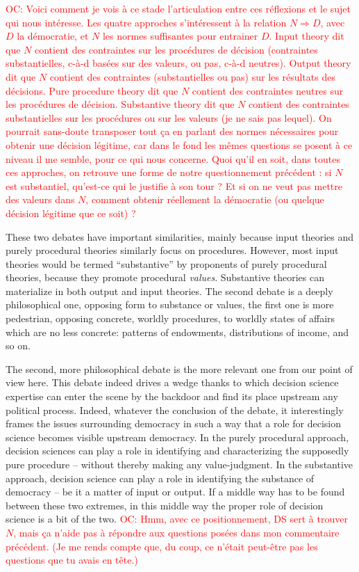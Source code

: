 \documentclass[preprint, french, english, 11pt]{elsarticle}%
\newcommand{\commentOC}[1]{\textcolor{red}{OC: #1}}
\begin{document}
\commentOC{Voici comment je vois à ce stade l’articulation entre ces réflexions et le sujet qui nous intéresse. Les quatre approches s’intéressent à la relation $N ⇒ D$, avec $D$ la démocratie, et $N$ les normes suffisantes pour entrainer $D$. Input theory dit que $N$ contient des contraintes sur les procédures de décision (contraintes substantielles, c-à-d basées sur des valeurs, ou pas, c-à-d neutres). Output theory dit que $N$ contient des contraintes (substantielles ou pas) sur les résultats des décisions. Pure procedure theory dit que $N$ contient des contraintes neutres sur les procédures de décision. Substantive theory dit que $N$ contient des contraintes substantielles sur les procédures ou sur les valeurs (je ne sais pas lequel). On pourrait sans-doute transposer tout ça en parlant des normes nécessaires pour obtenir une décision légitime, car dans le fond les mêmes questions se posent à ce niveau il me semble, pour ce qui nous concerne. Quoi qu’il en soit, dans toutes ces approches, on retrouve une forme de notre questionnement précédent : si $N$ est substantiel, qu’est-ce qui le justifie à son tour ? Et si on ne veut pas mettre des valeurs dans $N$, comment obtenir réellement la démocratie (ou quelque décision légitime que ce soit) ?}

These two debates have important similarities, mainly because input theories and purely procedural theories similarly focus on procedures. However, most input theories would be termed ``substantive'' by proponents of purely procedural theories, because they promote procedural \emph{values}. Substantive theories can materialize in both output and input theories. The second debate is a deeply philosophical one, opposing form to substance or values, the first one is more pedestrian, opposing concrete, worldly procedures, to worldly states of affairs which are no less concrete: patterns of endowments, distributions of income, and so on.

The second, more philosophical debate is the more relevant one from our point of view here. This debate indeed drives a wedge thanks to which decision science expertise can enter the scene by the backdoor and find its place upstream any political process. Indeed, whatever the conclusion of the debate, it interestingly frames the issues surrounding democracy in such a way that a role for decision science becomes visible upstream democracy. In the purely procedural approach, decision sciences can play a role in identifying and characterizing the supposedly pure procedure -- without thereby making any value-judgment. In the substantive approach, decision science can play a role in identifying the substance of democracy -- be it a matter of input or output. If a middle way has to be found between these two extremes, in this middle way the proper role of decision science is a bit of the two.
\commentOC{Hmm, avec ce positionnement, DS sert à trouver $N$, mais ça n’aide pas à répondre aux questions posées dans mon commentaire précédent. (Je me rends compte que, du coup, ce n’était peut-être pas les questions que tu avais en tête.)}
\end{document}
